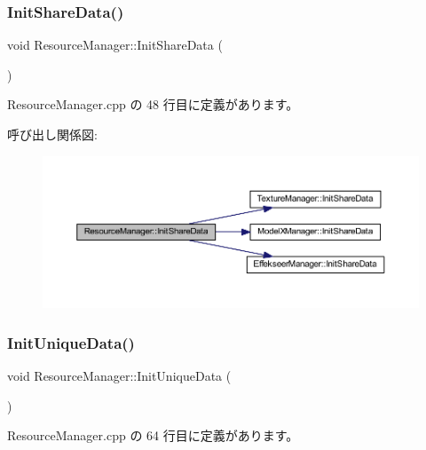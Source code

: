 \subsubsection{\texorpdfstring{Init\+Share\+Data()}{InitShareData()}}
{\footnotesize\ttfamily void Resource\+Manager\+::\+Init\+Share\+Data (\begin{DoxyParamCaption}{ }\end{DoxyParamCaption})\hspace{0.3cm}{\ttfamily [static]}}



 Resource\+Manager.\+cpp の 48 行目に定義があります。

呼び出し関係図\+:
\nopagebreak
\begin{figure}[H]
\begin{center}
\leavevmode
\includegraphics[width=350pt]{class_resource_manager_af9be166f96250b01b9070a262cdb5d34_cgraph}
\end{center}
\end{figure}
\mbox{\label{class_resource_manager_ab1ea00fb7eb4006bb9cbb48612da2c79}} 
\subsubsection{\texorpdfstring{Init\+Unique\+Data()}{InitUniqueData()}}
{\footnotesize\ttfamily void Resource\+Manager\+::\+Init\+Unique\+Data (\begin{DoxyParamCaption}{ }\end{DoxyParamCaption})\hspace{0.3cm}{\ttfamily [static]}}



 Resource\+Manager.\+cpp の 64 行目に定義があります。

